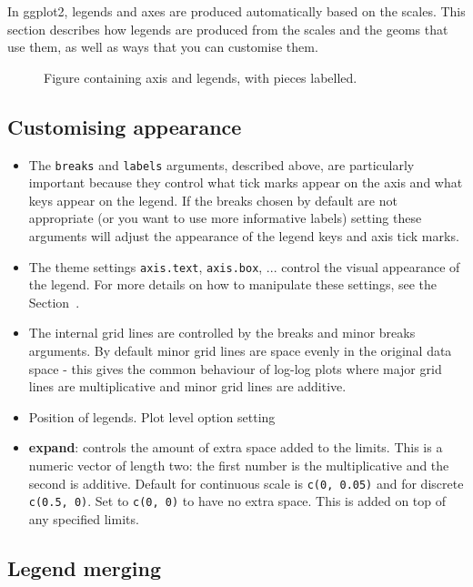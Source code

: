 In ggplot2, legends and axes are produced automatically based on the scales.  This section describes how legends are produced from the scales and the geoms that use them, as well as ways that you can customise them.

\begin{figure}[htbp]
  \centering
  \caption{Figure containing axis and legends, with pieces labelled.}
  \label{fig:label}
\end{figure}

\subsection{Customising appearance}

\begin{itemize}
  \item The {\tt breaks} and {\tt labels} arguments, described above, are particularly important because they control what tick marks appear on the axis and what keys appear on the legend.  If the breaks chosen by default are not appropriate (or you want to use more informative labels) setting these arguments will adjust the appearance of the legend keys and axis tick marks.  
  
  \item The theme settings {\tt axis.text}, {\tt axis.box}, ... control the visual appearance of the legend.  For more details on how to manipulate these settings, see the Section~.

  \item The internal grid lines are controlled by the breaks and minor breaks arguments.  By default minor grid lines are space evenly in the original data space - this gives the common behaviour of log-log plots where major grid lines are multiplicative and minor grid lines are additive.
  
  \item Position of legends.  Plot level option setting 
  
  \item {\bf expand}: controls the amount of extra space added to the limits.  This is a numeric vector of length two: the first number is the multiplicative and the second is additive.  Default for continuous scale is {\tt c(0, 0.05)} and for discrete {\tt c(0.5, 0)}.  Set to {\tt c(0, 0)} to have no extra space.  This is added on top of any specified limits.
  
\end{itemize}

\subsection{Legend merging}

